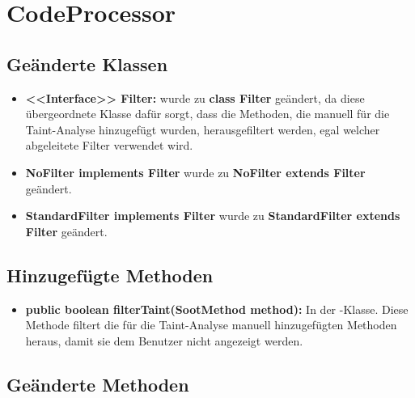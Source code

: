 \section{CodeProcessor}

\subsection{Geänderte Klassen}

\begin{itemize}
	\item \textbf{<<Interface>> Filter:} wurde zu \textbf{class Filter} geändert, da diese übergeordnete Klasse dafür sorgt, dass die Methoden, die manuell für die Taint-Analyse hinzugefügt wurden, herausgefiltert werden, egal welcher abgeleitete Filter verwendet wird.
	
	\item \textbf{NoFilter implements Filter} wurde zu \textbf{NoFilter extends Filter} geändert.
	
	\item \textbf{StandardFilter implements Filter} wurde zu \textbf{StandardFilter extends Filter} geändert.
\end{itemize}

\subsection{Hinzugefügte Methoden}

\begin{itemize}
	\item \textbf{public boolean filterTaint(SootMethod method):} In der -Klasse. Diese Methode filtert die für die Taint-Analyse manuell hinzugefügten Methoden heraus, damit sie dem Benutzer nicht angezeigt werden.
\end{itemize}

\subsection{Geänderte Methoden}

